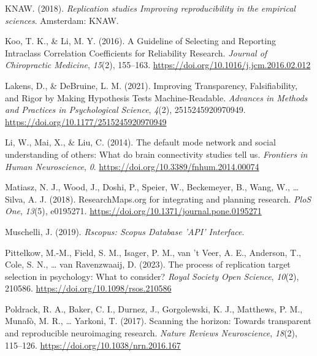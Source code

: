\documentclass[
  man,floatsintext]{apa6}
\newlength{\cslhangindent}
\newlength{\cslentryspacingunit} %
\newenvironment{CSLReferences}[2] %
 {%
  \setlength{\parindent}{0pt}
  \ifodd #1
  \let\oldpar\par
  \def\par{\hangindent=\cslhangindent\oldpar}
  \fi
  \setlength{\parskip}{#2\cslentryspacingunit}
 }%
 {}
\begin{document}
\begin{CSLReferences}{1}{0}
\leavevmode{}%
KNAW. (2018). \emph{Replication studies \textendash{} {Improving} reproducibility in the empirical sciences}. {Amsterdam}: {KNAW}.

\leavevmode{}%
Koo, T. K., \& Li, M. Y. (2016). A {Guideline} of {Selecting} and {Reporting Intraclass Correlation Coefficients} for {Reliability Research}. \emph{Journal of Chiropractic Medicine}, \emph{15}(2), 155--163. \url{https://doi.org/10.1016/j.jcm.2016.02.012}

\leavevmode{}%
Lakens, D., \& DeBruine, L. M. (2021). Improving {Transparency}, {Falsifiability}, and {Rigor} by {Making Hypothesis Tests Machine-Readable}. \emph{Advances in Methods and Practices in Psychological Science}, \emph{4}(2), 2515245920970949. \url{https://doi.org/10.1177/2515245920970949}

\leavevmode{}%
Li, W., Mai, X., \& Liu, C. (2014). The default mode network and social understanding of others: What do brain connectivity studies tell us. \emph{Frontiers in Human Neuroscience}, \emph{0}. \url{https://doi.org/10.3389/fnhum.2014.00074}

\leavevmode{}%
Matiasz, N. J., Wood, J., Doshi, P., Speier, W., Beckemeyer, B., Wang, W., \ldots{} Silva, A. J. (2018). {ResearchMaps}.org for integrating and planning research. \emph{PloS One}, \emph{13}(5), e0195271. \url{https://doi.org/10.1371/journal.pone.0195271}

\leavevmode{}%
Muschelli, J. (2019). \emph{Rscopus: {Scopus Database} '{API}' {Interface}}.

\leavevmode{}%
Pittelkow, M.-M., Field, S. M., Isager, P. M., van 't Veer, A. E., Anderson, T., Cole, S. N., \ldots{} van Ravenzwaaij, D. (2023). The process of replication target selection in psychology: What to consider? \emph{Royal Society Open Science}, \emph{10}(2), 210586. \url{https://doi.org/10.1098/rsos.210586}

\leavevmode{}%
Poldrack, R. A., Baker, C. I., Durnez, J., Gorgolewski, K. J., Matthews, P. M., Munafò, M. R., \ldots{} Yarkoni, T. (2017). Scanning the horizon: Towards transparent and reproducible neuroimaging research. \emph{Nature Reviews Neuroscience}, \emph{18}(2), 115--126. \url{https://doi.org/10.1038/nrn.2016.167}


\end{CSLReferences}
\end{document}
